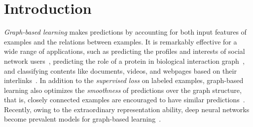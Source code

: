 \documentclass[10pt,journal,compsoc]{IEEEtran}
\begin{document}
\maketitle
\IEEEdisplaynontitleabstractindextext
\IEEEpeerreviewmaketitle

\section{Introduction}
\textit{Graph-based learning} makes predictions by accounting for both input features of examples and the relations between examples. It is remarkably effective for a wide range of applications, such as predicting the profiles and interests of social network users~\cite{wang2016structural,grover2016node2vec}, predicting the role of a protein in biological interaction graph~\cite{hamilton2017inductive,ying2018hierarchical}, and classifying contents like documents, videos, and webpages based on their interlinks~\cite{perozzi2014deepwalk,tang2015line,kipf2017semi}. In addition to the \textit{supervised loss} on labeled examples, graph-based learning also optimizes the \textit{smoothness} of predictions over the graph structure, that is, closely connected examples are encouraged to have similar predictions~\cite{zhu2003semi,zhou2004learning,ni2018co,velickovic2018graph}. Recently, owing to the extraordinary representation ability, deep neural networks become prevalent models for graph-based learning~\cite{yang2016revisiting,wang2016structural,kipf2017semi,ni2018co,velickovic2018graph}.
\end{document}
